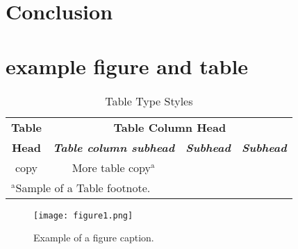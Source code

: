 \documentclass[conference,a4paper]{IEEEtran}
\begin{document}
\section{Conclusion}\label{sec: six}




\section{example figure and table}
\begin{table}[htbp]
\caption{Table Type Styles}
\begin{center}
\begin{tabular}{|c|c|c|c|}
\hline
\textbf{Table}&\multicolumn{3}{|c|}{\textbf{Table Column Head}} \\
\cline{2-4} 
\textbf{Head} & \textbf{\textit{Table column subhead}}& \textbf{\textit{Subhead}}& \textbf{\textit{Subhead}} \\
\hline
copy& More table copy$^{\mathrm{a}}$& &  \\
\hline
\multicolumn{4}{l}{$^{\mathrm{a}}$Sample of a Table footnote.}
\end{tabular}
\label{tab1}
\end{center}
\end{table}

\begin{figure}[htbp]
\centerline{\texttt{[image: figure1.png]}}
\caption{Example of a figure caption.}
\label{fig}
\end{figure}




\end{document}
